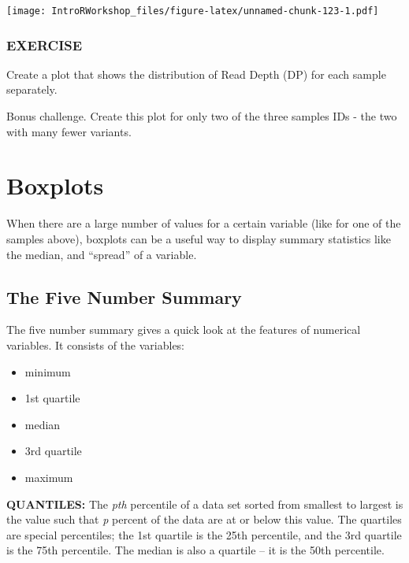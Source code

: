 \documentclass[]{book}
\providecommand{\tightlist}{%
  \setlength{\itemsep}{0pt}\setlength{\parskip}{0pt}}
\begin{document}
\texttt{[image: IntroRWorkshop\_files/figure-latex/unnamed-chunk-123-1.pdf]}

\hypertarget{exercise-27}{%
\subsubsection*{EXERCISE}\label{exercise-27}}

Create a plot that shows the distribution of Read Depth (DP) for each sample separately.

Bonus challenge. Create this plot for only two of the three samples IDs - the two with many fewer variants.

\hypertarget{boxplots}{%
\section{Boxplots}\label{boxplots}}

When there are a large number of values for a certain variable (like for one of the samples above), boxplots can be a useful way to display summary statistics like the median, and ``spread'' of a variable.

\hypertarget{the-five-number-summary}{%
\subsection*{The Five Number Summary}\label{the-five-number-summary}}

The five number summary gives a quick look at the features of numerical variables. It consists of the variables:

\begin{itemize}
\tightlist
\item
  minimum
\item
  1st quartile
\item
  median
\item
  3rd quartile
\item
  maximum
\end{itemize}

\textbf{QUANTILES:} The \emph{pth} percentile of a data set sorted from smallest to largest is the value such that \emph{p} percent of the data are at or below this value. The quartiles are special percentiles; the 1st quartile is the 25th percentile, and the 3rd quartile is the 75th percentile. The median is also a quartile -- it is the 50th percentile.
\end{document}
